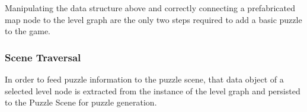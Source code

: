 Manipulating the data structure above and correctly connecting a prefabricated map node to the level graph are the only two steps required to add a basic puzzle to the game.

\subsubsection{Scene Traversal}
In order to feed puzzle information to the puzzle scene, that data object of a selected level node is extracted from the instance of the level graph and persisted to the Puzzle Scene for puzzle generation.